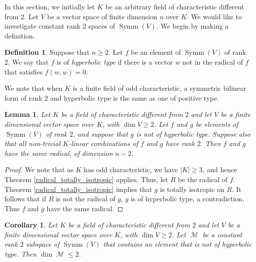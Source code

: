 \documentclass{amsart}
\DeclareMathOperator{\M}{\mathcal{M}}
\DeclareMathOperator{\Symm}{Symm}
\theoremstyle{plain}
\newtheorem{corollary}{Corollary}
\newtheorem{lemma}{Lemma}
\theoremstyle{definition}
\newtheorem{definition}{Definition}
\begin{document}
\noindent In this section, we initially let $K$ be an arbitrary field of characteristic different from 2. Let $V$ be a vector space of finite dimension $n$
over $K$. We would like to investigate constant rank 2 spaces of $\Symm(V)$. We begin by making a definition.

\begin{definition} \label{hyperbolic}
Suppose that $n\ge 2$. 
Let $f$ be an element of $\Symm(V)$ of rank 2. We say that $f$ is of \emph{hyperbolic type} if there is a vector $w$ not in the
radical of $f$ that satisfies $f(w,w)=0$.

\end{definition}

We note that when $K$ is a finite field of odd characteristic, a symmetric bilinear form of rank 2 and hyperbolic type is the same as one
of positive type.


\begin{lemma} \label{same_radical}
Let $K$ be a field of characteristic different from $2$ and let $V$ be a finite dimensional vector space over $K$, with $\dim V\geq 2$.
Let $f$ and $g$ be elements of $\Symm(V)$ of rank $2$, and suppose that $g$ is not of hyperbolic type. Suppose also that all non-trivial
$K$-linear combinations of $f$ and $g$ have rank $2$. Then $f$ and $g$ have the same radical, of dimension $n-2$. 

\end{lemma}

\begin{proof}

 We note that as $K$ has odd characteristic, we have $|K|\geq 3$, and hence Theorem \ref{radical_totally_isotropic} applies. Thus, let $R$ be the radical of $f$.
Theorem \ref{radical_totally_isotropic} implies that $g$ is totally isotropic on $R$. It follows that if $R$ is not the radical of $g$, $g$ is of hyperbolic type, a contradiction. Thus $f$ and $g$ have the same radical. 

\end{proof}

\begin{corollary} \label{dimension_at_most_2}
 Let $K$ be a field of characteristic different from $2$ and let $V$ be a finite dimensional vector space over $K$, with $\dim V\geq 2$.
Let $\M$ be a constant rank $2$ subspace of  $\Symm(V)$ that contains an element that is not of hyperbolic type. 
Then $\dim \M\leq 2$. 

\end{corollary}
\end{document}
